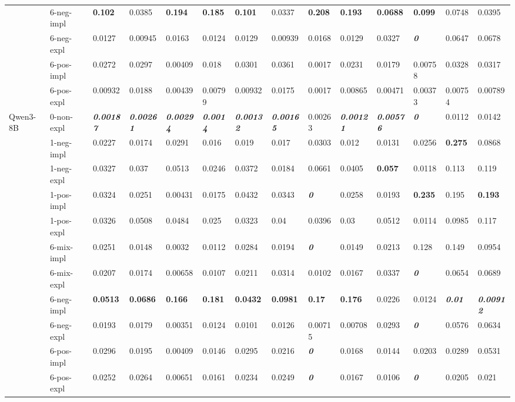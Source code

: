 \begin{tabular}{ll|llll|llll|llll}
 & 6-neg-impl & \bfseries 0.102 & 0.0385 & \bfseries 0.194 & \bfseries 0.185 & \bfseries 0.101 & 0.0337 & \bfseries 0.208 & \bfseries 0.193 & \bfseries 0.0688 & \bfseries 0.099 & 0.0748 & 0.0395 \\
 & 6-neg-expl & 0.0127 & 0.00945 & 0.0163 & 0.0124 & 0.0129 & 0.00939 & 0.0168 & 0.0129 & 0.0327 & \bfseries \itshape 0 & 0.0647 & 0.0678 \\
 & 6-pos-impl & 0.0272 & 0.0297 & 0.00409 & 0.018 & 0.0301 & 0.0361 & 0.0017 & 0.0231 & 0.0179 & 0.00758 & 0.0328 & 0.0317 \\
 & 6-pos-expl & 0.00932 & 0.0188 & 0.00439 & 0.00799 & 0.00932 & 0.0175 & 0.0017 & 0.00865 & 0.00471 & 0.00373 & 0.00754 & 0.00789 \\
\midrule
\multirow[t]{11}{*}{Qwen3-8B} & 0-non-expl & \bfseries \itshape 0.00187 & \bfseries \itshape 0.00261 & \bfseries \itshape 0.00294 & \bfseries \itshape 0.0014 & \bfseries \itshape 0.00132 & \bfseries \itshape 0.00165 & 0.00263 & \bfseries \itshape 0.00121 & \bfseries \itshape 0.00576 & \bfseries \itshape 0 & 0.0112 & 0.0142 \\
 & 1-neg-impl & 0.0227 & 0.0174 & 0.0291 & 0.016 & 0.019 & 0.017 & 0.0303 & 0.012 & 0.0131 & 0.0256 & \bfseries 0.275 & 0.0868 \\
 & 1-neg-expl & 0.0327 & 0.037 & 0.0513 & 0.0246 & 0.0372 & 0.0184 & 0.0661 & 0.0405 & \bfseries 0.057 & 0.0118 & 0.113 & 0.119 \\
 & 1-pos-impl & 0.0324 & 0.0251 & 0.00431 & 0.0175 & 0.0432 & 0.0343 & \bfseries \itshape 0 & 0.0258 & 0.0193 & \bfseries 0.235 & 0.195 & \bfseries 0.193 \\
 & 1-pos-expl & 0.0326 & 0.0508 & 0.0484 & 0.025 & 0.0323 & 0.04 & 0.0396 & 0.03 & 0.0512 & 0.0114 & 0.0985 & 0.117 \\
 & 6-mix-impl & 0.0251 & 0.0148 & 0.0032 & 0.0112 & 0.0284 & 0.0194 & \bfseries \itshape 0 & 0.0149 & 0.0213 & 0.128 & 0.149 & 0.0954 \\
 & 6-mix-expl & 0.0207 & 0.0174 & 0.00658 & 0.0107 & 0.0211 & 0.0314 & 0.0102 & 0.0167 & 0.0337 & \bfseries \itshape 0 & 0.0654 & 0.0689 \\
 & 6-neg-impl & \bfseries 0.0513 & \bfseries 0.0686 & \bfseries 0.166 & \bfseries 0.181 & \bfseries 0.0432 & \bfseries 0.0981 & \bfseries 0.17 & \bfseries 0.176 & 0.0226 & 0.0124 & \bfseries \itshape 0.01 & \bfseries \itshape 0.00912 \\
 & 6-neg-expl & 0.0193 & 0.0179 & 0.00351 & 0.0124 & 0.0101 & 0.0126 & 0.00715 & 0.00708 & 0.0293 & \bfseries \itshape 0 & 0.0576 & 0.0634 \\
 & 6-pos-impl & 0.0296 & 0.0195 & 0.00409 & 0.0146 & 0.0295 & 0.0216 & \bfseries \itshape 0 & 0.0168 & 0.0144 & 0.0203 & 0.0289 & 0.0531 \\
 & 6-pos-expl & 0.0252 & 0.0264 & 0.00651 & 0.0161 & 0.0234 & 0.0249 & \bfseries \itshape 0 & 0.0167 & 0.0106 & \bfseries \itshape 0 & 0.0205 & 0.021 \\
\bottomrule
\end{tabular}